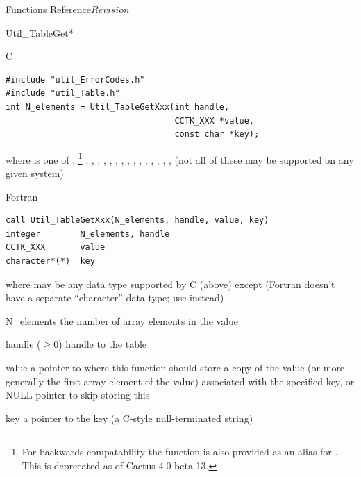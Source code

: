 \begin{cactuspart}{ Functions Reference}{}{$Revision$}
\begin{FunctionDescription}{Util\_TableGet*}
\begin{SynopsisSection}
\begin{Synopsis}{C}
\begin{verbatim}
#include "util_ErrorCodes.h"
#include "util_Table.h"
int N_elements = Util_TableGetXxx(int handle,
                                  CCTK_XXX *value,
                                  const char *key);
\end{verbatim}
where  is one of
   , %
\footnote{%
	 For backwards compatability the function
	  is also provided
	 as an alias for .
	 This is deprecated as of Cactus 4.0 beta 13.
	 }%
,
   , ,
   , , , , ,
   , , , ,
   , , , 
(not all of these may be supported on any given system)
\end{Synopsis}
\begin{Synopsis}{Fortran}
\begin{verbatim}
call Util_TableGetXxx(N_elements, handle, value, key)
integer        N_elements, handle
CCTK_XXX       value
character*(*)  key
\end{verbatim}
where  may be any data type supported by C (above)
except  (Fortran doesn't have a separate ``character''
data type; use  instead)
\end{Synopsis}
\end{SynopsisSection}

\begin{ResultSection}
\begin{Result}{N\_elements}
the number of array elements in the value
\end{Result}
\end{ResultSection}

\begin{ParameterSection}
\begin{Parameter}{handle ($\ge 0$)}
handle to the table
\end{Parameter}
\begin{Parameter}{value}
a pointer to where this function should store a copy of the value
(or more generally the first array element of the value) associated
with the specified key,
or NULL pointer to skip storing this
\end{Parameter}
\begin{Parameter}{key}
a pointer to the key (a C-style null-terminated string)
\end{Parameter}
\end{ParameterSection}


\end{FunctionDescription}
\end{cactuspart}
